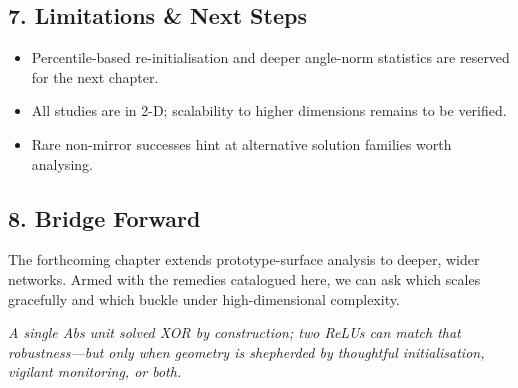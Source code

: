 \subsection*{7.  Limitations \& Next Steps}
\begin{itemize}
  \item Percentile-based re-initialisation and deeper angle-norm
        statistics are reserved for the next chapter.
  \item All studies are in 2-D; scalability to higher dimensions remains
        to be verified.
  \item Rare non-mirror successes hint at alternative solution families
        worth analysing.
\end{itemize}

\subsection*{8.  Bridge Forward}
The forthcoming chapter extends prototype-surface analysis
to deeper, wider networks.  Armed with the remedies catalogued here, we
can ask which scales gracefully and which buckle under high-dimensional
complexity.

\medskip
\begin{center}
\emph{A single Abs unit solved XOR by construction; two ReLUs can match
that robustness—but only when geometry is shepherded by thoughtful
initialisation, vigilant monitoring, or both.}
\end{center}
